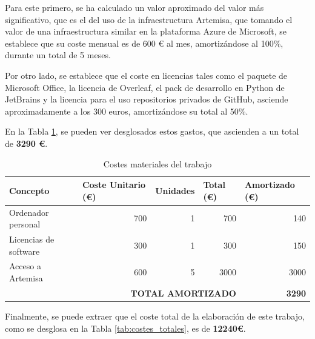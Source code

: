 Para este primero, se ha calculado un valor aproximado del valor más significativo, que es el del uso de la infraestructura Artemisa, que tomando el valor de una infraestructura similar en la plataforma Azure de Microsoft, se establece que su coste mensual es de 600 € al mes, amortizándose al 100\%, durante un total de 5 meses. 

Por otro lado, se establece que el coste en licencias tales como el paquete de Microsoft Office, la licencia de Overleaf, el pack de desarrollo en Python de JetBrains y la licencia para el uso repositorios privados de GitHub, asciende aproximadamente a los 300 euros, amortizándose su total al 50\%.

En la Tabla \ref{tab:costes_materiales}, se pueden ver desglosados estos gastos, que ascienden a un total de \textbf{3290 €}.

\begin{table}[h]
\caption{Costes materiales del trabajo}
\label{tab:costes_materiales}
\centering
\begin{tabular}{l|r|r|r|r}
\toprule
\textbf{Concepto}     & \multicolumn{1}{l|}{\textbf{Coste Unitario (€)}} & \multicolumn{1}{l|}{\textbf{Unidades}} & \multicolumn{1}{l|}{\textbf{Total (€)}} & \multicolumn{1}{l}{\textbf{Amortizado (€)}} \\ \hline
Ordenador personal    & 700                                              & 1                                      & 700                                     & 140                                         \\
Licencias de software & 300                                              & 1                                      & 300                                     & 150                                         \\
Acceso a Artemisa     & 600                                              & 5                                      & 3000                                    & 3000                                        \\ \hline
\multicolumn{4}{r|}{\textbf{TOTAL AMORTIZADO}}                                                                                                              & \textbf{3290}  \\
\bottomrule
\end{tabular}
\end{table}

Finalmente, se puede extraer que el coste total de la elaboración de este trabajo, como se desglosa en la Tabla \ref{tab:costes_totales}, es de \textbf{12240€}.

